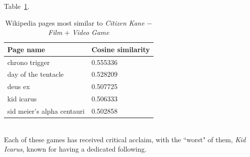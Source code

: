 \documentclass[11pt]{article}
\begin{document}
Table~\ref{tab:ckvg}.
\begin{table}[h]
  \begin{center}
    \begin{tabular}{l l}
      Page name & Cosine similarity\\
      \hline
      chrono trigger & 0.555336\\
      day of the tentacle & 0.528209\\
      deus ex & 0.507725\\
      kid icarus & 0.506333\\
      sid meier's alpha centauri & 0.502858\\
    \end{tabular}
  \caption{Wikipedia pages most similar to
           \emph{Citizen Kane} $-$ \emph{Film} $+$ \emph{Video Game}}
  \label{tab:ckvg}
  \end{center}
\end{table}
\\Each of these games has received critical acclaim, with the ``worst" of them,
\emph{Kid Icarus}, known for having a dedicated following.\\
\end{document}
